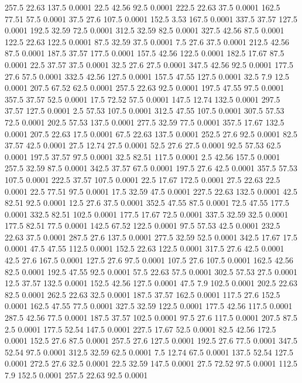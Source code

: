 257.5	22.63	137.5	0.0001
22.5	42.56	92.5	0.0001
222.5	22.63	37.5	0.0001
162.5	77.51	57.5	0.0001
37.5	27.6	107.5	0.0001
152.5	3.53	167.5	0.0001
337.5	37.57	127.5	0.0001
192.5	32.59	72.5	0.0001
312.5	32.59	82.5	0.0001
327.5	42.56	87.5	0.0001
122.5	22.63	122.5	0.0001
87.5	32.59	37.5	0.0001
7.5	27.6	37.5	0.0001
212.5	42.56	87.5	0.0001
187.5	37.57	177.5	0.0001
157.5	42.56	122.5	0.0001
182.5	17.67	87.5	0.0001
22.5	37.57	37.5	0.0001
32.5	27.6	27.5	0.0001
347.5	42.56	92.5	0.0001
177.5	27.6	57.5	0.0001
332.5	42.56	127.5	0.0001
157.5	47.55	127.5	0.0001
32.5	7.9	12.5	0.0001
207.5	67.52	62.5	0.0001
257.5	22.63	92.5	0.0001
197.5	47.55	97.5	0.0001
357.5	37.57	52.5	0.0001
17.5	72.52	57.5	0.0001
147.5	12.74	132.5	0.0001
297.5	37.57	127.5	0.0001
2.5	57.53	107.5	0.0001
312.5	47.55	107.5	0.0001
307.5	57.53	72.5	0.0001
202.5	57.53	137.5	0.0001
277.5	32.59	77.5	0.0001
357.5	17.67	132.5	0.0001
207.5	22.63	17.5	0.0001
67.5	22.63	137.5	0.0001
252.5	27.6	92.5	0.0001
82.5	37.57	42.5	0.0001
27.5	12.74	27.5	0.0001
52.5	27.6	27.5	0.0001
92.5	57.53	62.5	0.0001
197.5	37.57	97.5	0.0001
32.5	82.51	117.5	0.0001
2.5	42.56	157.5	0.0001
257.5	32.59	87.5	0.0001
342.5	37.57	67.5	0.0001
197.5	27.6	42.5	0.0001
357.5	57.53	107.5	0.0001
222.5	37.57	107.5	0.0001
22.5	17.67	172.5	0.0001
27.5	22.63	22.5	0.0001
22.5	77.51	97.5	0.0001
17.5	32.59	47.5	0.0001
227.5	22.63	132.5	0.0001
42.5	82.51	92.5	0.0001
12.5	27.6	37.5	0.0001
352.5	47.55	87.5	0.0001
72.5	47.55	177.5	0.0001
332.5	82.51	102.5	0.0001
177.5	17.67	72.5	0.0001
337.5	32.59	32.5	0.0001
177.5	82.51	77.5	0.0001
142.5	67.52	122.5	0.0001
97.5	57.53	42.5	0.0001
232.5	22.63	37.5	0.0001
287.5	27.6	137.5	0.0001
277.5	32.59	52.5	0.0001
342.5	17.67	17.5	0.0001
47.5	47.55	112.5	0.0001
152.5	22.63	122.5	0.0001
317.5	27.6	42.5	0.0001
42.5	27.6	167.5	0.0001
127.5	27.6	97.5	0.0001
107.5	27.6	107.5	0.0001
162.5	42.56	82.5	0.0001
192.5	47.55	92.5	0.0001
57.5	22.63	57.5	0.0001
302.5	57.53	27.5	0.0001
12.5	37.57	132.5	0.0001
152.5	42.56	127.5	0.0001
47.5	7.9	102.5	0.0001
202.5	22.63	82.5	0.0001
262.5	22.63	32.5	0.0001
187.5	37.57	162.5	0.0001
117.5	27.6	152.5	0.0001
162.5	47.55	77.5	0.0001
327.5	32.59	122.5	0.0001
177.5	42.56	117.5	0.0001
287.5	42.56	77.5	0.0001
187.5	37.57	102.5	0.0001
97.5	27.6	117.5	0.0001
207.5	87.5	2.5	0.0001
177.5	52.54	147.5	0.0001
227.5	17.67	52.5	0.0001
82.5	42.56	172.5	0.0001
152.5	27.6	87.5	0.0001
257.5	27.6	127.5	0.0001
192.5	27.6	77.5	0.0001
347.5	52.54	97.5	0.0001
312.5	32.59	62.5	0.0001
7.5	12.74	67.5	0.0001
137.5	52.54	127.5	0.0001
272.5	27.6	32.5	0.0001
22.5	32.59	147.5	0.0001
27.5	72.52	97.5	0.0001
112.5	7.9	152.5	0.0001
257.5	22.63	92.5	0.0001
